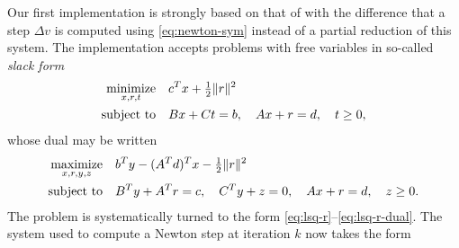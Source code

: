 \documentclass{amsart}
\begin{document}
Our first  implementation is strongly based on that of \cite{friedlander-orban-2012}
with the difference that a step $\Delta v$ is computed using
\eqref{eq:newton-sym} instead of a partial reduction of this system. The
implementation accepts problems with free variables in so-called \textit{slack
form}
\begin{equation}
  \label{eq:lsq-r-slack}
  \begin{aligned}
    \displaystyle\mathop{\textup{minimize}}_{x, r, t} \quad & c^T x + \tfrac{1}{2} \|r\|^2 \\
    \mathop{\textup{subject to}} \quad & Bx + Ct = b, \quad Ax + r = d, \quad t \geq 0,
  \end{aligned}
\end{equation}
whose dual may be written
\begin{equation}
  \label{eq:lsq-r-slack-dual}
  \begin{aligned}
    \displaystyle\mathop{\textup{maximize}}_{x, r, y, z} \quad & b^T y - (A^T d)^T x - \tfrac{1}{2} \|r\|^2 \\
    \mathop{\textup{subject to}} \quad & B^T y + A^T r = c, \quad
                C^T y + z = 0, \quad
                Ax + r = d, \quad z \geq 0.
  \end{aligned}
\end{equation}
The problem is systematically turned to the form
\eqref{eq:lsq-r}--\eqref{eq:lsq-r-dual}. The system used to compute a Newton
step at iteration $k$ now takes the form
\end{document}
